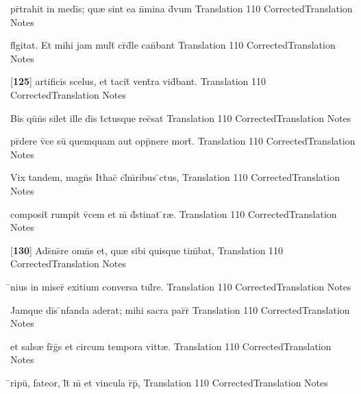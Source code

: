 \latline
  {pr\={}trahit in medi\={}s; qu{\ae} sint ea n\={}mina d\={\macron {\i}}vum}
  { Translation }
  {110}
  { CorrectedTranslation }
  { Notes }


\latline
  {fl\={}gitat.  Et mihi jam mult\={\macron {\i}} cr\={}d\={}le can\={}bant}
  { Translation }
  {110}
  { CorrectedTranslation }
  { Notes }


\latline
  {[\textbf{125}] artificis scelus, et tacit\={\macron {\i}} vent\={}ra vid\={}bant.}
  { Translation }
  {110}
  { CorrectedTranslation }
  { Notes }


\latline
  {Bis qu\={\macron {\i}}n\={}s silet ille di\={}s t\={}ctusque rec\={}sat}
  { Translation }
  {110}
  { CorrectedTranslation }
  { Notes }


\latline
  {pr\={}dere v\={}ce su\={} quemquam aut opp\={}nere mort\={\macron {\i}}.}
  { Translation }
  {110}
  { CorrectedTranslation }
  { Notes }


\latline
  {Vix tandem, magn\={\macron {\i}}s Ithac\={\macron {\i}} cl\={}m\={}ribus \={}ctus,}
  { Translation }
  {110}
  { CorrectedTranslation }
  { Notes }


\latline
  {composit\={} rumpit v\={}cem et m\={} d\={}stinat \={}r{\ae}.}
  { Translation }
  {110}
  { CorrectedTranslation }
  { Notes }


\latline
  {[\textbf{130}] Ads\={}ns\={}re omn\={}s et, qu{\ae} sibi quisque tim\={}bat,}
  { Translation }
  {110}
  { CorrectedTranslation }
  { Notes }


\latline
  {\={}nius in miser\={\macron {\i}} exitium conversa tul\={}re.}
  { Translation }
  {110}
  { CorrectedTranslation }
  { Notes }


\latline
  {Jamque di\={}s \={\macron {\i}}nfanda aderat; mihi sacra par\={}r\={\macron {\i}} }
  { Translation }
  {110}
  { CorrectedTranslation }
  { Notes }


\latline
  {et sals{\ae} fr\={}g\={}s et circum tempora vitt{\ae}.}
  { Translation }
  {110}
  { CorrectedTranslation }
  { Notes }


\latline
  {\={}ripu\={\macron {\i}}, fateor, l\={}t\={} m\={} et vincula r\={}p\={\macron {\i}},}
  { Translation }
  {110}
  { CorrectedTranslation }
  { Notes }


